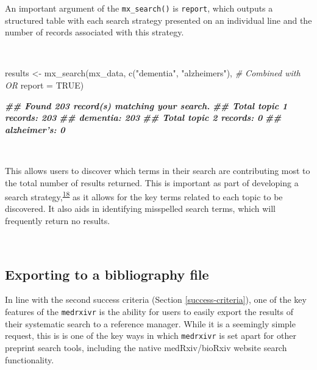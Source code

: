\documentclass[a4paper, twoside]{templates/ociamthesis}
\newenvironment{Shaded}{\begin{snugshade}}{\end{snugshade}}
\newcommand{\AttributeTok}[1]{\textcolor[rgb]{0.77,0.63,0.00}{#1}}
\newcommand{\CommentTok}[1]{\textcolor[rgb]{0.56,0.35,0.01}{\textit{#1}}}
\newcommand{\ConstantTok}[1]{\textcolor[rgb]{0.00,0.00,0.00}{#1}}
\newcommand{\DocumentationTok}[1]{\textcolor[rgb]{0.56,0.35,0.01}{\textbf{\textit{#1}}}}
\newcommand{\FunctionTok}[1]{\textcolor[rgb]{0.00,0.00,0.00}{#1}}
\newcommand{\NormalTok}[1]{#1}
\newcommand{\OtherTok}[1]{\textcolor[rgb]{0.56,0.35,0.01}{#1}}
\newcommand{\StringTok}[1]{\textcolor[rgb]{0.31,0.60,0.02}{#1}}
\renewenvironment{Shaded}
{
  \vspace{4pt}%
  \begin{snugshade}%
}{%
  \end{snugshade}%
  \vspace{4pt}%
}
\begin{document}
An important argument of the \texttt{mx\_search()} is \texttt{report}, which outputs a structured table with each search strategy presented on an individual line and the number of records associated with this strategy.

~

\begin{Shaded}
\begin{Highlighting}[]
\NormalTok{results  }\OtherTok{\textless{}{-}} \FunctionTok{mx\_search}\NormalTok{(mx\_data,}
                      \FunctionTok{c}\NormalTok{(}\StringTok{"dementia"}\NormalTok{, }\StringTok{"alzheimer\textquotesingle{}s"}\NormalTok{), }\CommentTok{\# Combined with OR}
                      \AttributeTok{report =} \ConstantTok{TRUE}\NormalTok{)}
\end{Highlighting}
\end{Shaded}

\begin{Shaded}
\begin{Highlighting}[]
\DocumentationTok{\#\# Found 203 record(s) matching your search.}
\DocumentationTok{\#\# Total topic 1 records: 203}
\DocumentationTok{\#\# dementia: 203}
\DocumentationTok{\#\# Total topic 2 records: 0}
\DocumentationTok{\#\# alzheimer’s: 0}
\end{Highlighting}
\end{Shaded}

~

This allows users to discover which terms in their search are contributing most to the total number of results returned. This is important as part of developing a search strategy,\textsuperscript{\protect\hyperlink{ref-bramer2018}{18}} as it allows for the key terms related to each topic to be discovered. It also aids in identifying misspelled search terms, which will frequently return no results.

~

\hypertarget{exporting-to-a-bibliography-file}{%
\subsection{Exporting to a bibliography file}\label{exporting-to-a-bibliography-file}}

In line with the second success criteria (Section \ref{success-criteria}), one of the key features of the \texttt{medrxivr} is the ability for users to easily export the results of their systematic search to a reference manager. While it is a seemingly simple request, this is is one of the key ways in which \texttt{medrxivr} is set apart for other preprint search tools, including the native medRxiv/bioRxiv website search functionality.
\end{document}
